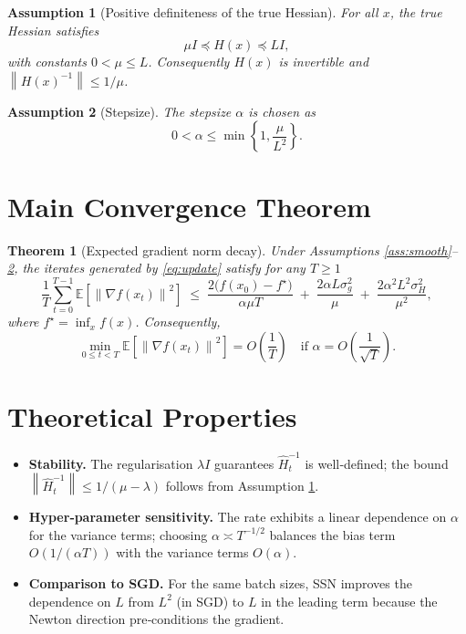 \documentclass{article}
\newtheorem{theorem}{Theorem}
\newtheorem{assumption}{Assumption}
\newcommand{\E}{\mathbb{E}}
\newcommand{\norm}[1]{\left\lVert#1\right\rVert}
\newcommand{\grad}{\nabla}
\begin{document}
\begin{assumption}[Positive definiteness of the true Hessian]\label{ass:posdef}
For all $x$, the true Hessian satisfies
\[
\mu I \preceq H(x) \preceq L I,
\]
with constants $0<\mu\le L$. Consequently $H(x)$ is invertible and $\norm{H(x)^{-1}}\le 1/\mu$.
\end{assumption}

\begin{assumption}[Stepsize]\label{ass:step}
The stepsize $\alpha$ is chosen as
\[
0<\alpha\le \min\!\left\{1,\frac{\mu}{L^{2}}\right\}.
\]
\end{assumption}

\section*{Main Convergence Theorem}
\begin{theorem}[Expected gradient norm decay]\label{thm:main}
Under Assumptions \ref{ass:smooth}–\ref{ass:step}, the iterates generated by \eqref{eq:update} satisfy for any $T\ge 1$
\[
\frac{1}{T}\sum_{t=0}^{T-1}\E\!\left[\norm{\grad f(x_t)}^{2}\right]
\;\le\;
\frac{2\bigl(f(x_0)-f^{\star}\bigr)}{\alpha\mu T}
\;+\;
\frac{2\alpha L\sigma_g^{2}}{\mu}
\;+\;
\frac{2\alpha^{2}L^{2}\sigma_H^{2}}{\mu^{2}},
\]
where $f^{\star}= \inf_{x}f(x)$. Consequently,
\[
\min_{0\le t<T}\E\!\left[\norm{\grad f(x_t)}^{2}\right]=O\!\left(\frac{1}{T}\right)
\quad\text{if }\alpha=O\!\left(\frac{1}{\sqrt{T}}\right).
\]
\end{theorem}

\section*{Theoretical Properties}
\begin{itemize}
\item \textbf{Stability.} The regularisation $\lambda I$ guarantees $\widehat H_t^{-1}$ is well‑defined; the bound $\norm{\widehat H_t^{-1}}\le 1/(\mu-\lambda)$ follows from Assumption \ref{ass:posdef}.
\item \textbf{Hyper‑parameter sensitivity.} The rate exhibits a linear dependence on $\alpha$ for the variance terms; choosing $\alpha\asymp T^{-1/2}$ balances the bias term $O(1/(\alpha T))$ with the variance terms $O(\alpha)$.
\item \textbf{Comparison to SGD.} For the same batch sizes, SSN improves the dependence on $L$ from $L^{2}$ (in SGD) to $L$ in the leading term because the Newton direction pre‑conditions the gradient.
\end{itemize}
\end{document}
